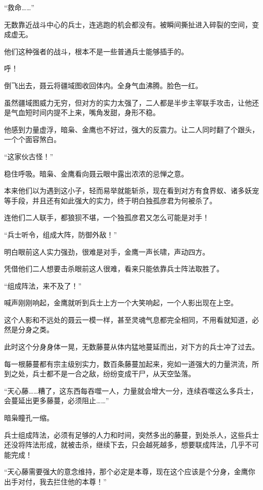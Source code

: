 \begin{this_body}
“救命……”

无数靠近战斗中心的兵士，连逃跑的机会都没有。被瞬间撕扯进入碎裂的空间，变成虚无。

他们这种强者的战斗，根本不是一些普通兵士能够插手的。

呼！

倒飞出去，聂云将疆域图收回体内。全身气血沸腾。脸色一红。

虽然疆域图威力无穷，但对方的实力太强了，二人都是半步主宰联手攻击，让他还是气血短时间内提不上来，嘴角发甜，身形不稳。

他感到力量虚浮，暗枭、金鹰也不好过，强大的反震力。让二人同时翻了个跟头，一个个面容煞白。

“这家伙古怪！”

稳住呼吸。暗枭、金鹰看向聂云眼中露出浓浓的忌惮之意。

本来他们以为遇到这小子，轻而易举就能斩杀，现在看到对方有食界蚁、诸多妖宠等手段，并且还有如此强大的实力，终于明白独孤彦君为何被杀了。

连他们二人联手，都狼狈不堪，一个独孤彦君又怎么可能是对手！

“兵士听令，组成大阵，防御外敌！”

明白眼前这人实力强劲，很难是对手，金鹰一声长啸，声动四方。

凭借他们二人想要击杀眼前这人很难，看来只能依靠兵士阵法取胜了。

“组成阵法，来不及了！”

喊声刚刚响起，金鹰就听到兵士上方一个大笑响起，一个人影出现在上空。

这个人影和不远处的聂云一模一样，甚至灵魂气息都完全相同，不用看就知道，必然是分身之类。

此时这个分身身体一晃，无数藤蔓从体内猛地蔓延而出，对下方的兵士冲了过去。

每一根藤蔓都有宗主级别实力，数百条藤蔓加起来，宛如一道强大的力量洪流，所到之处，兵士都不是一合之敌，纷纷变成干尸，从天空坠落。

“天心藤……糟了，这东西每吞噬一人，力量就会增大一分，连续吞噬这么多兵士，会蔓延出更多藤蔓，必须阻止……”

暗枭瞳孔一缩。

兵士组成阵法，必须有足够的人力和时间，突然多出的藤蔓，到处杀人，这些兵士还没将阵法形成，就被击杀，继续下去，只会越死越多，想要联成阵法，几乎不可能完成！

“天心藤需要强大的意念维持，那个必定是本尊，现在这个应该是个分身，金鹰你出手对付，我去拦住他的本尊！”


\end{this_body}
